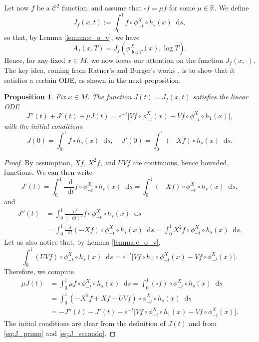 \documentclass[11pt]{article}
\newcommand \R{\mathbb{R}}
\newcommand*{\diff}{\mathop{}\!\mathrm{d}}
\newcommand{\aver}[1]{A_{#1}(x,T)}
\newtheorem {proposition}[theorem]{Proposition}
\theoremstyle{definition}
\begin{document}
Let now $f$ be a $\mathscr{C}^2$ function, and assume that $\square f = \mu f$ for some $\mu \in \R$.
We define
\[
J_f(x,t) := \int_0^1 f \circ \phi^X_{-t}\circ h_s(x) \diff s,
\]
so that, by Lemma \ref{lemma:c_o_v}, we have
\begin{equation}\label{eq:aver_equals_I}
\aver{f} = J_f(\phi^X_{\log T}(x), \log T).
\end{equation}
Hence, for any fixed $x \in M$, we now focus our attention on the function $J_f(x, \cdot)$.
The key idea, coming from Ratner's and Burger's works \cite{Rat1, Bur}, is to show that it satisfies a certain ODE, as shown in the next proposition.

\begin{proposition}\label{thm:eq_diff}
Fix $x \in M$. The function $J(t) = J_f(x,t) $ satisfies the linear ODE
\begin{equation*}
J''(t)+J'(t)+ \mu J(t) = e^{-t} \bigl[ Vf \circ \phi^X_{-t}(x) - Vf \circ \phi^X_{-t} \circ h_1(x) \bigr],
\end{equation*}
with the initial conditions
\[
J(0) = \int_0^1 f \circ h_s(x) \diff s,\ \ \ \ \ J'(0) = \int_0^1 (-Xf) \circ h_s(x) \diff s.
\]
\end{proposition}
\begin{proof}
By assumption, $Xf$, $X^2f$, and $UVf$ are continuous, hence bounded, functions.
We can then write
\begin{equation}\label{eq:J_primo}
J'(t) = \int_0^1 \frac{\diff}{\diff t} f\circ \phi^X_{-t}\circ h_s(x) \diff s = \int_0^1 (-Xf) \circ \phi^X_{-t}\circ h_s(x) \diff s,
\end{equation}
and
\begin{equation}\label{eq:J_secondo}
\begin{split}
J''(t) &= \int_0^1 \frac{\diff^2}{(\diff t)^2} f\circ \phi^X_{-t}\circ h_s(x) \diff s\\
&= \int_0^1 \frac{\diff}{\diff t} (-Xf)\circ \phi^X_{-t}\circ h_s(x) \diff s = \int_0^1 X^2f \circ \phi^X_{-t}\circ h_s(x) \diff s.
\end{split}
\end{equation}
Let us also notice that, by Lemma \ref{lemma:c_o_v},
\[
\int_0^1 (UVf) \circ \phi^X_{-t}\circ h_s(x) \diff s = e^{-t}\bigl[ Vf\circ h_{e^t} \circ \phi^X_{-t}(x) - Vf \circ \phi^X_{-t}(x)\bigr].
\]
Therefore, we compute
\begin{equation*}
\begin{split}
\mu J(t) &= \int_0^1 \mu f \circ \phi^X_{-t}\circ h_s(x) \diff s = \int_0^1 (\square f) \circ \phi^X_{-t}\circ h_s(x) \diff s \\
&= \int_0^1 (-X^2f+Xf -UVf) \circ \phi^X_{-t}\circ h_s(x) \diff s \\
&= - J''(t) -J'(t) - e^{-t}\bigl[ Vf \circ \phi^X_{-t}\circ h_{1}(x) - Vf \circ \phi^X_{-t}(x)\bigr].
\end{split}
\end{equation*}
The initial conditions are clear from the definition of $J(t)$ and from \eqref{eq:J_primo} and \eqref{eq:J_secondo}.
\end{proof}
\end{document}
